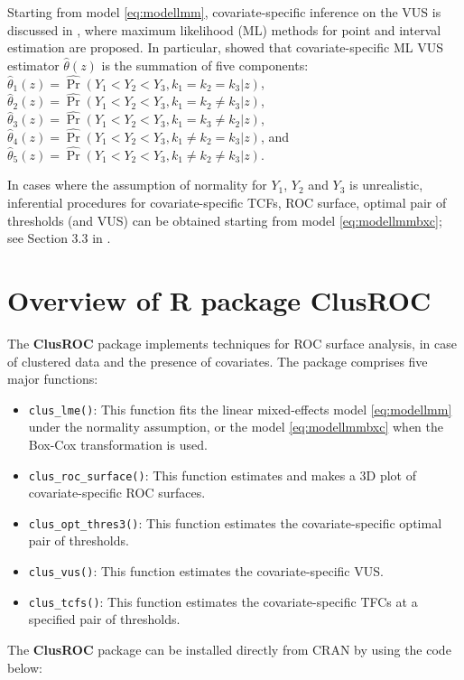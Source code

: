 Starting from model \eqref{eq:modellmm}, covariate-specific inference on the VUS is discussed in \citet{xiong2018estimating}, where maximum likelihood (ML) methods for point and interval estimation are proposed. In particular, \citet{xiong2018estimating} showed that covariate-specific ML VUS estimator $\hat{\theta}(z)$ is the summation of five components: $\hat{\theta}_1(z) = \widehat{\Pr}(Y_1 < Y_2 < Y_3, k_1 = k_2 = k_3|z)$, $\hat{\theta}_2(z) = \widehat{\Pr}(Y_1 < Y_2 < Y_3, k_1 = k_2 \ne k_3|z)$, $\hat{\theta}_3(z) = \widehat{\Pr}(Y_1 < Y_2 < Y_3, k_1 = k_3 \ne k_2|z)$, $\hat{\theta}_4(z) = \widehat{\Pr}(Y_1 < Y_2 < Y_3, k_1 \ne k_2 = k_3|z)$, and $\hat{\theta}_5(z) = \widehat{\Pr}(Y_1 < Y_2 < Y_3, k_1 \ne k_2 \ne k_3|z)$.

In cases where the assumption of normality for $Y_1$, $Y_2$ and $Y_3$ is unrealistic, inferential procedures for covariate-specific TCFs, ROC surface, optimal pair of thresholds (and VUS) can be obtained starting from model \eqref{eq:modellmmbxc}; see Section 3.3 in \citet{khanh2022}.

\hypertarget{overview-of-r-package-clusroc}{%
\section{Overview of R package
ClusROC}\label{overview-of-r-package-clusroc}}

The \textbf{ClusROC} package implements techniques for ROC surface analysis, in case of clustered data and the presence of covariates. The package comprises five major functions:
{
\begin{itemize}
\item \texttt{clus\_lme()}: This function fits the linear mixed-effects model \eqref{eq:modellmm} under the normality assumption, or the model \eqref{eq:modellmmbxc} when the Box-Cox transformation is used.
\item \texttt{clus\_roc\_surface()}: This function estimates and makes a 3D plot of covariate-specific ROC surfaces.
\item \texttt{clus\_opt\_thres3()}: This function estimates the covariate-specific optimal pair of thresholds.
\item \texttt{clus\_vus()}: This function estimates the covariate-specific VUS.
\item \texttt{clus\_tcfs()}: This function estimates the covariate-specific TFCs at a specified pair of thresholds.
\end{itemize}
}

The \textbf{ClusROC} package can be installed directly from CRAN by using the code below:

